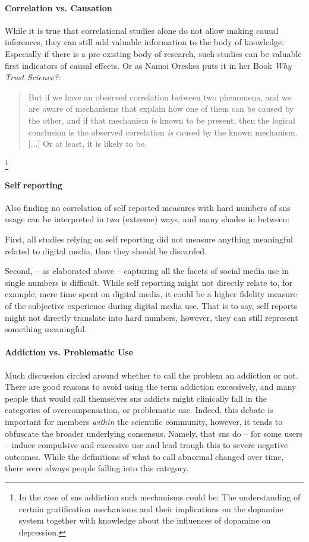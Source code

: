 \paragraph{Correlation vs. Causation} While it is true that correlational studies alone do not allow making causal inferences, they can still add valuable information to the body of knowledge.
Especially if there is a pre-existing body of research, such studies can be valuable first indicators of causal effects.
Or as Namoi Oreskes puts it in her Book \emph{Why Trust Science?}:
\begin{quote}
    But if we have an observed correlation between two phenomena, and we are aware of mechanisms that explain how one of them can be caused by the other, and if that mechanism is known to be present, then the logical conclusion is the observed correlation \emph{is} caused by the known mechanism. [...] Or at least, it is likely to be.
\end{quote}
\citep[p 116]{oreskes_why_2019}\footnote{In the case of \gls{sns} addiction such mechanisms could be: The understanding of certain gratification mechanisms and their implications on the dopamine system together with knowledge about the influences of dopamine on depression.}

\paragraph{Self reporting} Also finding no correlation of self reported measures with hard numbers of \gls{sns} usage can be interpreted in two (extreme) ways, and many shades in between:

First, all studies relying on self reporting did not measure anything meaningful related to digital media, thus they should be discarded.

Second, -- as elaborated above -- capturing all the facets of social media use in single numbers is difficult.
While self reporting might not directly relate to, for example, mere time spent on digital media, it could be a higher fidelity measure of the subjective experience during digital media use.
That is to say, self reports might not directly translate into hard numbers, however, they can still represent something meaningful.

\paragraph{Addiction vs. Problematic Use}
Much discussion circled around whether to call the problem an addiction or not.
There are good reasons to avoid using the term addiction excessively, and many people that would call themselves \gls{sns} addicts might clinically fall in the categories of overcompensation, or problematic use.
Indeed, this debate is important for members \textit{within} the scientific community, however, it tends to obfuscate the broader underlying consensus.
Namely, that \gls{sns} do -- for some users -- induce compulsive and excessive use and lead trough this to severe negative outcomes. 
While the definitions of what to call abnormal changed over time, there were always people falling into this category.

